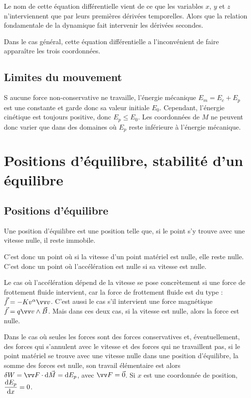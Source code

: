 Le nom de cette équation différentielle vient de ce que les variables $x$, $y$ et $z$ n'interviennent que par leurs premières dérivées temporelles. Alors que la relation fondamentale de la dynamique fait intervenir les dérivées secondes.

Dans le cas général, cette équation différentielle a l'inconvénient de faire apparaître les trois coordonnées.

\subsection{Limites du mouvement}
\label{chap4-subsec:limitesdumvt}

S aucune force non-conservative ne travaille, l'énergie mécanique $E_m=E_c+E_p$ est une constante et garde donc sa valeur initiale $E_0$. Cependant, l'énergie cinétique est toujours positive, donc $E_p \leq E_0$. Les coordonnées de $M$ ne peuvent donc varier que dans des domaines où $E_p$ reste inférieure à l'énergie mécanique.

\section{Positions d'équilibre, stabilité d'un équilibre}
\label{chap4-sec:positiondequilibre}

\subsection{Positions d'équilibre}
\label{chap4-subsec:positionsdequilibre}

\begin{defdef}
  Une position d'équilibre est une position telle que, si le point s'y trouve avec une vitesse nulle, il reste immobile.
\end{defdef}

C'est donc un point où si la vitesse d'un point matériel est nulle, elle reste nulle. C'est donc un point où l'accélération est nulle si sa vitesse est nulle.

Le cas où l'accélération dépend de la vitesse se pose concrètement si une force de frottement fluide intervient, car la force de frottement fluide est du type : $\vec{f}=-Kv^{\alpha}\vvv$. C'est aussi le cas s'il intervient une force magnétique $\vec{f} = q\vvv \wedge \vec{B}$. Mais dans ces deux cas, si la vitesse est nulle, alors la force est nulle.

Dans le cas où seules les forces sont des forces conservatives et, éventuellement, des forces qui s'annulent avec le vitesse et des forces qui ne travaillent pas, si le point matériel se trouve avec une vitesse nulle dans une position d'équilibre, la somme des forces est nulle, son travail élémentaire est alors $\delta W=\vF \cdot \D\vec{M}=\D E_p$, avec $\vF=\vec{0}$. Si $x$ est une coordonnée de position, $\dfrac{\mathrm{d} E_p}{\mathrm{d} x}=0$.

